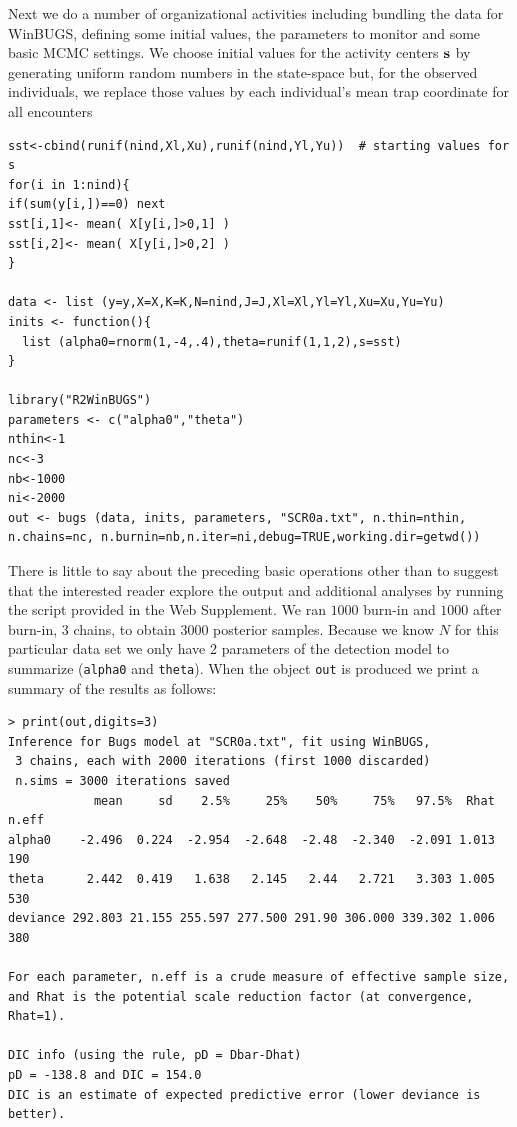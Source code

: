 Next we do a number of organizational activities including bundling
the data for WinBUGS, defining some initial values, the parameters to
monitor and some basic MCMC settings.  We choose initial values for
the activity centers ${\bf s}$ by generating uniform random numbers in
the state-space but, for the observed individuals, we replace those
values by each individual's mean trap coordinate for all encounters
\begin{verbatim}
sst<-cbind(runif(nind,Xl,Xu),runif(nind,Yl,Yu))  # starting values for s
for(i in 1:nind){
if(sum(y[i,])==0) next
sst[i,1]<- mean( X[y[i,]>0,1] )
sst[i,2]<- mean( X[y[i,]>0,2] )
}

data <- list (y=y,X=X,K=K,N=nind,J=J,Xl=Xl,Yl=Yl,Xu=Xu,Yu=Yu)
inits <- function(){
  list (alpha0=rnorm(1,-4,.4),theta=runif(1,1,2),s=sst)
}

library("R2WinBUGS")
parameters <- c("alpha0","theta")
nthin<-1
nc<-3
nb<-1000
ni<-2000
out <- bugs (data, inits, parameters, "SCR0a.txt", n.thin=nthin,
n.chains=nc, n.burnin=nb,n.iter=ni,debug=TRUE,working.dir=getwd())
\end{verbatim}

There is little to say about the preceding basic operations other than
to suggest that the interested reader explore the output and
additional analyses by running the script provided in the Web
Supplement.  We ran $1000$ burn-in and $1000$ after burn-in, 3 chains,
to obtain 3000 posterior samples.  Because we know $N$ for this
particular data set we only have 2 parameters of the detection model
to summarize (\mbox{\tt alpha0} and \mbox{\tt theta}).  When the
object \mbox{\tt out} is produced we print a summary of the results as
follows:
{\small
\begin{verbatim}
> print(out,digits=3)
Inference for Bugs model at "SCR0a.txt", fit using WinBUGS,
 3 chains, each with 2000 iterations (first 1000 discarded)
 n.sims = 3000 iterations saved
            mean     sd    2.5%     25%    50%     75%   97.5%  Rhat n.eff
alpha0    -2.496  0.224  -2.954  -2.648  -2.48  -2.340  -2.091 1.013   190
theta      2.442  0.419   1.638   2.145   2.44   2.721   3.303 1.005   530
deviance 292.803 21.155 255.597 277.500 291.90 306.000 339.302 1.006   380

For each parameter, n.eff is a crude measure of effective sample size,
and Rhat is the potential scale reduction factor (at convergence, Rhat=1).

DIC info (using the rule, pD = Dbar-Dhat)
pD = -138.8 and DIC = 154.0
DIC is an estimate of expected predictive error (lower deviance is better).
\end{verbatim}
}

